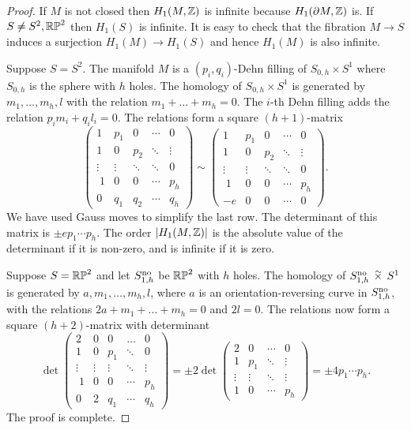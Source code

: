 \begin{proof}
If $M$ is not closed then $H_1(M,\mathbb{Z})$ is infinite because $H_1(\partial M,\mathbb{Z})$ is. If $S\neq S^2, \mathbb{RP}^2$ then $H_1(S)$ is infinite. It is easy to check that the fibration $M\to S$ induces a surjection $H_1(M)\to H_1(S)$ and hence $H_1(M)$ is also infinite.

Suppose $S=S^2$. The manifold $M$ is a $(p_i,q_i)$-Dehn filling of $S_{0,h}\times S^1$ where $S_{0,h}$ is the sphere with $h$ holes. The homology of $S_{0,h}\times S^1$ is generated by $m_1,\ldots,m_h,l$ with the relation $m_1+\ldots + m_h=0$. The $i$-th Dehn filling adds the relation $p_im_i + q_il_i=0$. The relations form a square $(h+1)$-matrix
$$
\begin{pmatrix}
1 & p_1 & 0 & \cdots & 0 \\
1 & 0 & p_2 & \ddots & \vdots \\
\vdots & \vdots & \ddots & \ddots & 0 \\
\phantom{\Big|} \! 1 & 0 & 0 & \cdots & p_h \\
0 & q_1 & q_2 & \cdots & q_h
\end{pmatrix}
\sim
\begin{pmatrix}
1 & p_1 & 0 & \cdots & 0 \\
1 & 0 & p_2 & \ddots & \vdots \\
\vdots & \vdots & \ddots & \ddots & 0 \\
\phantom{\Big|} \! 1 & 0 & 0 & \cdots & p_h \\
-e & 0 & 0 & \cdots & 0
\end{pmatrix}.
$$
We have used Gauss moves to simplify the last row. The determinant of this matrix is $\pm ep_1\cdots p_h$. The order $|H_1(M,\mathbb{Z})|$ is the absolute value of the determinant if it is non-zero, and is infinite if it is zero.

Suppose $S=\mathbb{RP}^2$ and let $S^{\rm no}_{1,h}$ be $\mathbb{RP}^2$ with $h$ holes. The homology of $S^{\rm no}_{1,h} \timtil S^1$ is generated by $a,m_1,\ldots, m_h, l$, where $a$ is an orientation-reversing curve in $S^{\rm no}_{1,h}$, with the relations $2a+m_1+\ldots +m_h=0$ and $2l=0$. The relations now form a square $(h+2)$-matrix with determinant
$$
\det \begin{pmatrix}
2 & 0 & 0 & \ldots & 0 \\
1 & 0 & p_1 & \ddots & 0 \\
\vdots & \vdots & \vdots & \ddots & \vdots \\
\phantom{\Big|} \! 1 & 0 & 0 & \cdots & p_h \\
0 & 2& q_1 & \cdots & q_h
\end{pmatrix}
= \pm 2 \det
\begin{pmatrix}
2 & 0 & \cdots & 0 \\
1 & p_1 & \ddots & \vdots \\
\vdots & \vdots & \ddots & \vdots \\
1 & 0 & \cdots & p_h
\end{pmatrix} = \pm 4 p_1\cdots p_h.
$$
The proof is complete.
\end{proof}

